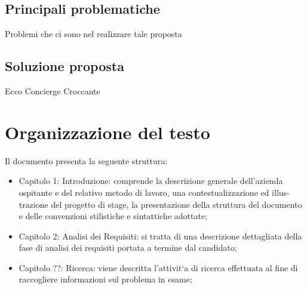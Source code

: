 \subsection{Principali problematiche}
Problemi che ci sono nel realizzare tale proposta
\subsection{Soluzione proposta}
Ecco Concierge Croccante

\section{Organizzazione del testo}
Il documento presenta la seguente struttura:
\begin{itemize}
    \item Capitolo 1: Introduzione: comprende la descrizione generale dell’azienda ospitante e del relativo metodo di lavoro, una contestualizzazione ed illus- trazione del progetto di stage, la presentazione della struttura del documento e delle convenzioni stilistiche e sintattiche adottate;
    \item Capitolo 2: Analisi dei Requisiti: si tratta di una descrizione dettagliata della fase di analisi dei requisiti portata a termine dal candidato;
    \item Capitolo ??: Ricerca: viene descritta l’attivit`a di ricerca effettuata al fine di raccogliere informazioni sul problema in esame;
\end{itemize}




